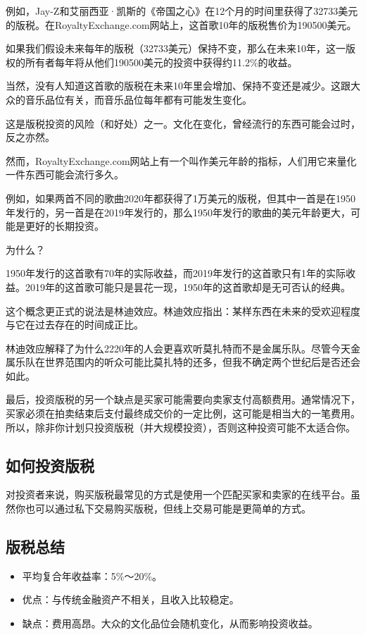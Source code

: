 例如，Jay-Z和艾丽西亚·凯斯的《帝国之心》在12个月的时间里获得了32733美元的版税。在RoyaltyExchange.com网站上，这首歌10年的版税售价为190500美元。

如果我们假设未来每年的版税（32733美元）保持不变，那么在未来10年，这一版权的所有者每年将从他们190500美元的投资中获得约11.2\%的收益。

当然，没有人知道这首歌的版税在未来10年里会增加、保持不变还是减少。这跟大众的音乐品位有关，而音乐品位每年都有可能发生变化。

这是版税投资的风险（和好处）之一。文化在变化，曾经流行的东西可能会过时，反之亦然。

然而，RoyaltyExchange.com网站上有一个叫作美元年龄的指标，人们用它来量化一件东西可能会流行多久。

例如，如果两首不同的歌曲2020年都获得了1万美元的版税，但其中一首是在1950年发行的，另一首是在2019年发行的，那么1950年发行的歌曲的美元年龄更大，可能是更好的长期投资。

为什么？

1950年发行的这首歌有70年的实际收益，而2019年发行的这首歌只有1年的实际收益。2019年的这首歌可能只是昙花一现，1950年的这首歌却是无可否认的经典。

这个概念更正式的说法是林迪效应。林迪效应指出：某样东西在未来的受欢迎程度与它在过去存在的时间成正比。

林迪效应解释了为什么2220年的人会更喜欢听莫扎特而不是金属乐队。尽管今天金属乐队在世界范围内的听众可能比莫扎特的还多，但我不确定两个世纪后是否还会如此。

最后，投资版税的另一个缺点是买家可能需要向卖家支付高额费用。通常情况下，买家必须在拍卖结束后支付最终成交价的一定比例，这可能是相当大的一笔费用。所以，除非你计划只投资版税（并大规模投资），否则这种投资可能不太适合你。

\subsection{如何投资版税}
对投资者来说，购买版税最常见的方式是使用一个匹配买家和卖家的在线平台。虽然你也可以通过私下交易购买版税，但线上交易可能是更简单的方式。

\subsection{版税总结}
\begin{itemize}
\item 平均复合年收益率：5\%～20\%。
\item 优点：与传统金融资产不相关，且收入比较稳定。
\item 缺点：费用高昂。大众的文化品位会随机变化，从而影响投资收益。
\end{itemize}
